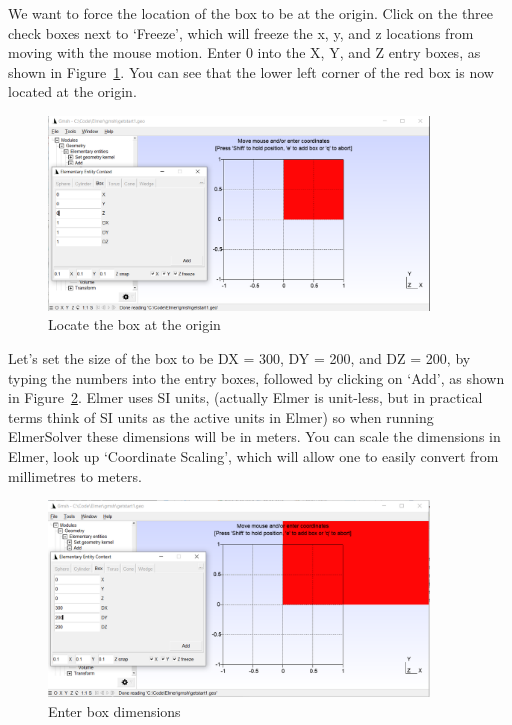 We want to force the location of the box to be at the origin.  Click on the three check boxes next to `Freeze', which will freeze the x, y, and z locations from moving with the mouse motion.  Enter 0 into the X, Y, and Z entry boxes, as shown in Figure~\ref{fg:gmsh-10}.  You can see that the lower left corner of the red box is now located at the origin.

\begin{figure}[H]
\centering
\includegraphics[width=0.9\textwidth]{gmsh-10}
\caption{Locate the box at the origin}\label{fg:gmsh-10}
\end{figure}

Let's set the size of the box to be DX = 300, DY = 200, and DZ = 200, by typing the numbers into the entry boxes, followed by clicking on `Add', as shown in Figure~\ref{fg:gmsh-11}.  Elmer uses SI units, (actually Elmer is unit-less, but in practical terms think of SI units as the active units in Elmer) so when running ElmerSolver these dimensions will be in meters.  You can scale the dimensions in Elmer, look up `Coordinate Scaling', which will allow one to easily convert from millimetres to meters.

\begin{figure}[H]
\centering
\includegraphics[width=0.9\textwidth]{gmsh-11}
\caption{Enter box dimensions}\label{fg:gmsh-11}
\end{figure}

